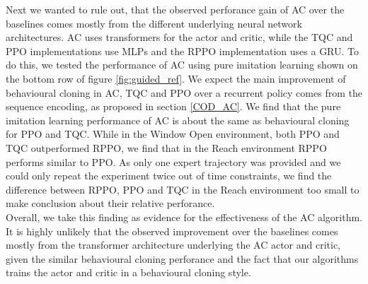 Next we wanted to rule out, that the observed perforance gain of AC over the baselines comes mostly from the different underlying neural network architectures. AC uses transformers for the actor and 
critic, while the TQC and PPO implementations use MLPs and the RPPO implementation uses a GRU. To do this, we tested the performance of AC using pure imitation learning shown on the bottom row of 
figure \ref{fig:guided_ref}. We expect the main improvement of behavioural cloning in AC, TQC and PPO over a recurrent policy comes from the sequence encoding, as proposed in section \ref{COD_AC}.
We find that the pure imitation learning performance 
of AC is about the same as behavioural cloning for PPO and TQC. While in the Window Open environment, both PPO and TQC outperformed RPPO, we find that in the Reach environment RPPO performs 
similar to PPO. As only one expert trajectory was provided and we could only repeat the experiment twice out of time constraints, we find the difference between RPPO, PPO and TQC in the Reach 
environment too small to make conclusion about their relative perforance. \\
Overall, we take this finding as evidence for the effectiveness of the AC algorithm. It is highly unlikely that the observed improvement 
over the baselines comes mostly from the transformer architecture underlying the AC actor and critic, given the similar behavioural cloning perforance and the fact that our algorithms trains the actor and 
critic in a behavioural cloning style.  

